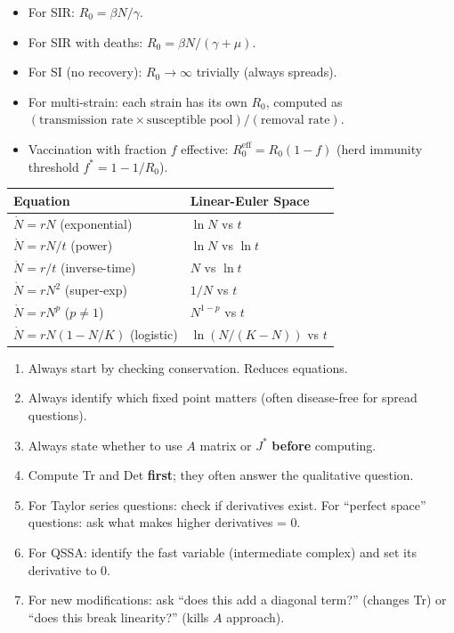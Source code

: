 \documentclass[10pt]{article}
\begin{document}
\begin{tcolorbox}[colback=red!3,colframe=red!70!black,title=\textbf{Tricks for Computing $R_0$}]
\begin{itemize}
\item For SIR: $R_0 = \beta N/\gamma$.
\item For SIR with deaths: $R_0 = \beta N/(\gamma + \mu)$.
\item For SI (no recovery): $R_0 \to \infty$ trivially (always spreads).
\item For multi-strain: each strain has its own $R_0$, computed as $(\text{transmission rate}\times \text{susceptible pool})/(\text{removal rate})$.
\item Vaccination with fraction $f$ effective: $R_0^\text{eff} = R_0(1 - f)$ (herd immunity threshold $f^* = 1 - 1/R_0$).
\end{itemize}
\end{tcolorbox}

\begin{tcolorbox}[colback=green!3,colframe=green!50!black,title=\textbf{Common Linear Spaces (Euler-Exact)}]
\begin{tabular}{ll}
\textbf{Equation} & \textbf{Linear-Euler Space}\\\hline
$\dot N = rN$ (exponential) & $\ln N$ vs $t$\\
$\dot N = rN/t$ (power) & $\ln N$ vs $\ln t$\\
$\dot N = r/t$ (inverse-time) & $N$ vs $\ln t$\\
$\dot N = rN^2$ (super-exp) & $1/N$ vs $t$\\
$\dot N = rN^p$ ($p\neq 1$) & $N^{1-p}$ vs $t$\\
$\dot N = rN(1-N/K)$ (logistic) & $\ln(N/(K-N))$ vs $t$\\
\end{tabular}
\end{tcolorbox}

\begin{tcolorbox}[colback=purple!3,colframe=purple!70!black,title=\textbf{When in Doubt on Exam}]
\begin{enumerate}
\item Always start by checking conservation. Reduces equations.
\item Always identify which fixed point matters (often disease-free for spread questions).
\item Always state whether to use $A$ matrix or $J^*$ \textbf{before} computing.
\item Compute Tr and Det \textbf{first}; they often answer the qualitative question.
\item For Taylor series questions: check if derivatives exist. For ``perfect space'' questions: ask what makes higher derivatives = 0.
\item For QSSA: identify the fast variable (intermediate complex) and set its derivative to 0.
\item For new modifications: ask ``does this add a diagonal term?'' (changes Tr) or ``does this break linearity?'' (kills $A$ approach).
\end{enumerate}
\end{tcolorbox}
\end{document}
